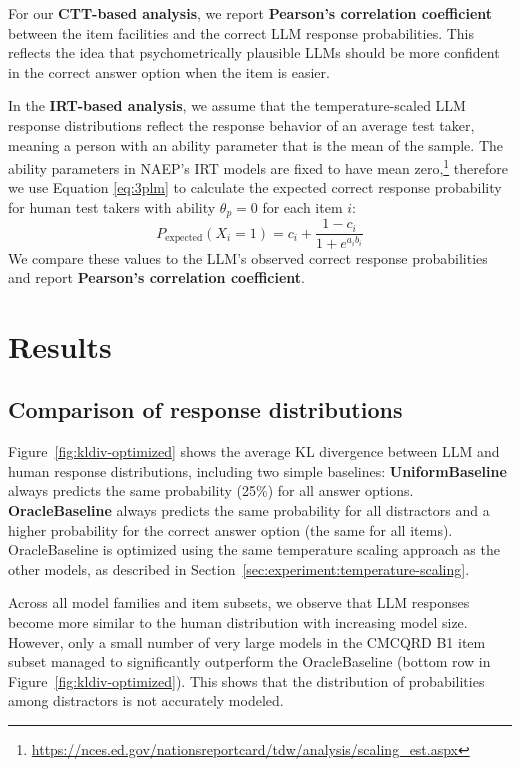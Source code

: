 \documentclass[11pt]{article}
\begin{document}
For our \textbf{CTT-based analysis}, we report \textbf{Pearson's correlation coefficient} between the item facilities and the correct LLM response probabilities. This reflects the idea that psychometrically plausible LLMs should be more confident in the correct answer option when the item is easier.

In the \textbf{IRT-based analysis}, we assume that the temperature-scaled LLM response distributions reflect the response behavior of an average test taker, meaning a person with an ability parameter that is the mean of the sample. The ability parameters in NAEP's IRT models are fixed to have mean zero,\footnote{\url{https://nces.ed.gov/nationsreportcard/tdw/analysis/scaling_est.aspx}} therefore we use Equation \ref{eq:3plm} to calculate the expected correct response probability for human test takers with ability $\theta_p = 0$ for each item $i$:
\begin{equation}
  P_\text{expected}(X_i = 1) = c_i + \frac{1 - c_i}{1 + e^{a_i b_i}}
  \label{eq:3plm-theta0}
\end{equation}
We compare these values to the LLM's observed correct response probabilities and report \textbf{Pearson's correlation coefficient}.


\section{Results}

\subsection{Comparison of response distributions}

Figure~\ref{fig:kldiv-optimized} shows the average KL divergence between LLM and human response distributions, including two simple baselines: \textbf{UniformBaseline} always predicts the same probability (25\%) for all answer options. \textbf{OracleBaseline} always predicts the same probability for all distractors and a higher probability for the correct answer option (the same for all items). OracleBaseline is optimized using the same temperature scaling approach as the other models, as described in Section~\ref{sec:experiment:temperature-scaling}.

Across all model families and item subsets, we observe that LLM responses become more similar to the human distribution with increasing model size. However, only a small number of very large models in the CMCQRD B1 item subset managed to significantly outperform the OracleBaseline (bottom row in Figure~\ref{fig:kldiv-optimized}). This shows that the distribution of probabilities among distractors is not accurately modeled.
\end{document}
